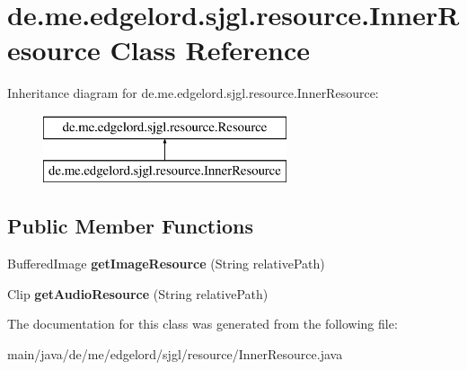 \hypertarget{classde_1_1me_1_1edgelord_1_1sjgl_1_1resource_1_1_inner_resource}{}\section{de.\+me.\+edgelord.\+sjgl.\+resource.\+Inner\+Resource Class Reference}
\label{classde_1_1me_1_1edgelord_1_1sjgl_1_1resource_1_1_inner_resource}
Inheritance diagram for de.\+me.\+edgelord.\+sjgl.\+resource.\+Inner\+Resource\+:\begin{figure}[H]
\begin{center}
\leavevmode
\includegraphics[height=2.000000cm]{classde_1_1me_1_1edgelord_1_1sjgl_1_1resource_1_1_inner_resource}
\end{center}
\end{figure}
\subsection*{Public Member Functions}
\begin{DoxyCompactItemize}
\item 
\mbox{\label{classde_1_1me_1_1edgelord_1_1sjgl_1_1resource_1_1_inner_resource_a07d7f39c42acf30a39012b0256e987e9}} 
Buffered\+Image {\bfseries get\+Image\+Resource} (String relative\+Path)
\item 
\mbox{\label{classde_1_1me_1_1edgelord_1_1sjgl_1_1resource_1_1_inner_resource_a4a779b9c03783772c7f7f53b72ab4954}} 
Clip {\bfseries get\+Audio\+Resource} (String relative\+Path)
\end{DoxyCompactItemize}


The documentation for this class was generated from the following file\+:\begin{DoxyCompactItemize}
\item 
main/java/de/me/edgelord/sjgl/resource/Inner\+Resource.\+java\end{DoxyCompactItemize}
